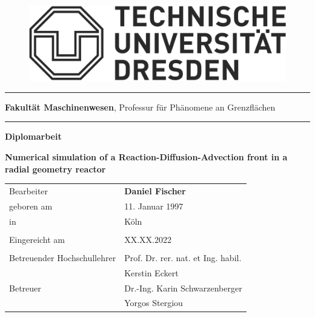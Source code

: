 \documentclass[../thesis.tex]{subfiles}
\begin{document}
\begin{titlepage}
	\begin{addmargin}[22mm]{0mm}
		\begin{figure}[t]
			\hspace*{5mm}\includegraphics[scale=0.35]{figs/Logo.png} \vspace{-8mm}
		\end{figure}
		\rule{140mm}{.4pt}
		\vspace{0.4mm}

		\scriptsize { {\bfseries Fakultät Maschinenwesen},
			Professur für Phänomene an Grenzflächen}
		\vspace{-1.4mm}

		\rule{140mm}{.4pt}
		\vspace{2cm}

		{\Large \bfseries Diplomarbeit}
		\vspace{2cm}

		{\LARGE \bfseries Numerical simulation of a Reaction-Diffusion-Advection front in a 
			radial geometry reactor \par}
		\vspace{2cm}
		\begin{addmargin}[-2mm]{0mm}
			\large
			\begin{tabular}{l l}
			  Bearbeiter                   & {\bfseries Daniel Fischer} \\
			  geboren am                   & 11. Januar 1997 \\
			  in                           & Köln \\ \\
			  Eingereicht am               & XX.XX.2022 \\ \\
			  Betreuender Hochschullehrer  & Prof. Dr. rer. nat. et Ing. habil. \\ 
			  							   & Kerstin Eckert \\
			  Betreuer                     & Dr.-Ing. Karin Schwarzenberger  \\
			  							   & Yorgos Stergiou \\

			\end{tabular}
		\end{addmargin}
	\end{addmargin}
\end{titlepage}
\end{document}
